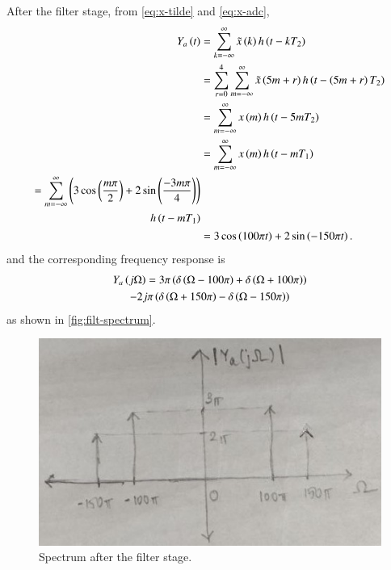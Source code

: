 \documentclass[journal,12pt,twocolumn]{IEEEtran}
\begin{document}
\begin{enumerate}[label=\theenumi.]
    After the filter stage, from \eqref{eq:x-tilde} and \eqref{eq:x-adc},
    \begin{align}
        Y_{a}\left(t\right) &= \sum_{k=-\infty}^{\infty}\tilde{x}\left(k\right)h\left(t-kT_2\right) \\
                       &= \sum_{r=0}^{4}\sum_{m=-\infty}^{\infty}\tilde{x}\left(5m+r\right)h\left(t-\left(5m+r\right)T_2\right) \\
                       &= \sum_{m=-\infty}^{\infty}x\left(m\right)h\left(t-5mT_2\right) \\
                       &= \sum_{m=-\infty}^{\infty}x\left(m\right)h\left(t-mT_1\right) \\
                    \begin{split}
                       = \sum_{m=-\infty}^{\infty}\left(3\cos\left(\frac{m\pi}{2}\right) + 2\sin\left(\frac{-3m\pi}{4}\right)\right)\\
                       h\left(t-mT_1\right)
                    \end{split} \\
                       &= 3\cos\left(100\pi{}t\right) + 2\sin\left(-150\pi{}t\right).
                       \label{eq:Y-ob}
    \end{align}
    and the corresponding frequency response is
    \begin{multline}
        Y_a\left(j\Omega\right) = 3\pi\left(\delta\left(\Omega-100\pi\right) + \delta\left(\Omega+100\pi\right)\right) \\
        - 2j\pi\left(\delta\left(\Omega+150\pi\right) - \delta\left(\Omega-150\pi\right)\right)
    \end{multline}
    as shown in \autoref{fig:filt-spectrum}.

    \begin{figure}[!ht]
        \centering
        \includegraphics[width=\columnwidth]{figs/filt-spectrum.jpg}
        \caption{Spectrum after the filter stage.}
        \label{fig:filt-spectrum}
    \end{figure}


\end{enumerate}
\end{document}
